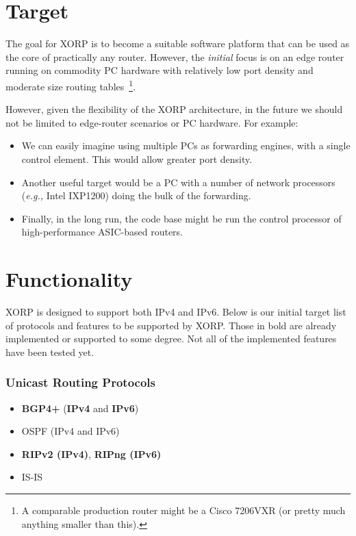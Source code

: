 \documentclass[11pt]{article}
\newcommand{\eg}{\emph{e.g.,}\xspace}
\begin{document}
\section{Target}

The goal for XORP is to become a suitable software platform that can
be used as the core of practically any router. However, the {\it
initial} focus is on an edge router running on commodity PC hardware
with relatively low port density and moderate size routing
tables~\footnote{A comparable production router might be a Cisco
7206VXR (or pretty much anything smaller than this).}.

However, given the flexibility of the XORP architecture, in the future
we should not be limited to edge-router scenarios or PC hardware.  For
example:
\begin{itemize}
  \item We can easily imagine using multiple PCs as forwarding engines,
  with a single control element. This would allow greater port density.

  \item Another useful target would be a PC with a number of network
  processors (\eg Intel IXP1200) doing the bulk of the forwarding.

  \item Finally, in the long run, the code base might be run the
  control processor of high-performance ASIC-based routers.
\end{itemize}

\section{Functionality}

XORP is designed to support both IPv4 and IPv6.
Below is our initial target list of protocols and features to be
supported by XORP. Those in bold are already implemented or supported
to some degree. Not all of the implemented features have been tested
yet.

\subsubsection*{Unicast Routing Protocols}

\begin{itemize}
  \item {\bf BGP4+} ({\bf IPv4} and {\bf IPv6})
  \item OSPF (IPv4 and IPv6)
  \item {\bf RIPv2 (IPv4)}, {\bf RIPng (IPv6)}
  \item IS-IS
\end{itemize}
\end{document}
